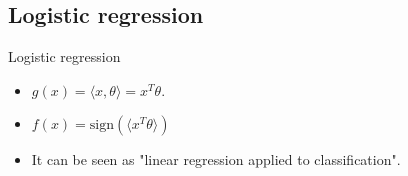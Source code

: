 \documentclass[usenames,dvipsnames,french]{beamer}
\DeclareMathOperator*{\argmin}{arg\,min}
\newtheorem*{proposition}{Proposition}
\begin{document}
%    
%
%
%
%    
%
%
%
%    
%
%
%    
%
%
%
\subsection{Logistic regression}%
\label{sub:logistic_regression}

\begin{frame}{Logistic regression}
    
    \begin{itemize}
        \item $ g(x) = \langle x, \theta \rangle = x^T \theta $.
	\item $f(x) = \text{sign}( \langle  x^T\theta \rangle )$
	\item It can be seen as "linear regression applied to classification".
    \end{itemize}
\end{frame}
\end{document}
